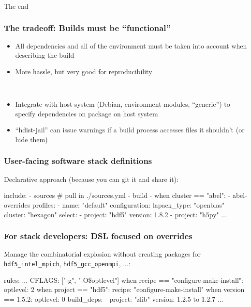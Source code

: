 \documentclass[sans,mathserif]{beamer}
\begin{document}
\begin{frame}
  \begin{center}
    {\Large The end}
  \end{center}
\end{frame}

\begin{frame}
  \frametitle{The tradeoff: Builds must be ``functional''}
  \begin{itemize}
  \item<+-> All dependencies and all of the environment must be
    taken into account when describing the build
  \item<+-> More hassle, but very good for reproducibility
  \end{itemize}
~
~
\begin{itemize}
\item<+-> Integrate with host system (Debian, environment modules,
  ``generic'') to specify dependencies on package on host system
\item<+-> ``hdist-jail'' can issue warnings if a build process
  accesses files it shouldn't (or hide them)
\end{itemize}
\end{frame}

\begin{frame}[fragile]
\frametitle{User-facing software stack definitions}
Declarative approach (because you can git it and share it):

{\small

\begin{semiverbatim}
include:
  - sources # pull in ./sources.yml
  - build
  - when cluster == "abel":
    - abel-overrides
profiles:
  - name: "default"
    configuration:
      lapack_type: "openblas"
      cluster: "hexagon"
    select:
      - project: "hdf5"
        version: 1.8.2
      - project: "h5py"
        ...
\end{semiverbatim}
}
\end{frame}

\begin{frame}[fragile]
\frametitle{For stack developers: DSL focused on overrides}

Manage the combinatorial explosion without creating
packages for {\tt hdf5\_intel\_mpich}, {\tt hdf5\_gcc\_openmpi}, ...:
{

\begin{semiverbatim}
rules:
  ...
  CFLAGS: ["-g", "-O\$optlevel"]
  when recipe == "configure-make-install":
    optlevel: 2
  when project == "hdf5":
    recipe: "configure-make-install"
    when version == 1.5.2:
      optlevel: 0
    build_deps:
      - project: "zlib"
        version: 1.2.5 to 1.2.7
  ...
\end{semiverbatim}
}
\end{frame}
\end{document}
